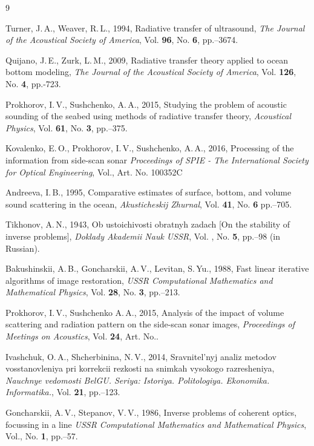 \documentclass{procDDs}
\begin{document}
\begin {thebibliography}{9}

 Turner, J.\,A., Weaver, R.\,L., 1994, 
Radiative transfer of ultrasound, 
\emph{The Journal of the Acoustical Society of America},  
Vol.\; {\bf 96}, No. {\bf 6}, pp.--3674.

 Quijano, J.\,E., Zurk, L.\,M., 2009, 
Radiative transfer theory applied to ocean bottom modeling, 
\emph{The Journal of the Acoustical Society of America},  
Vol.\; {\bf 126}, No. {\bf 4}, pp.-723.

  Prokhorov, I.\,V., Sushchenko, A.\,A., 2015, 
Studying the problem of acoustic sounding of the seabed using methods of radiative transfer theory, 
\emph{Acoustical Physics},
Vol.\; {\bf 61}, No. {\bf 3}, pp.--375.

 Kovalenko, E.\,O., Prokhorov, I.\,V., Sushchenko, A.\,A., 2016,
Processing of the information from side-scan sonar
\emph{Proceedings of SPIE - The International Society for Optical Engineering},
Vol., Art. No. \;100352C

 Andreeva,  I.\,B., 1995,
Comparative estimates of surface, bottom, and volume sound scattering in the ocean,
\emph{Akusticheskij Zhurnal},
Vol.\; {\bf 41}, No. {\bf 6} pp.--705.

 Tikhonov, A.\,N., 1943, 
Ob ustoichivosti obratnyh zadach [On the stability of inverse problems], 
\emph{Doklady Akademii Nauk USSR}, 
Vol. , No. {\bf 5}, pp.--98 (in Russian).

 Bakushinskii, A.\,B., Goncharskii, A.\,V., Levitan, S.\,Yu., 1988,
Fast linear iterative algorithms of image restoration,
\emph{USSR Computational Mathematics and Mathematical Physics},
Vol.\; {\bf 28}, No. { \bf 3},  pp.--213.

 Prokhorov, I.\,V., Sushchenko A.\,A., 2015,
Analysis of the impact of volume scattering and radiation pattern on the side-scan sonar images, 
\emph{Proceedings of Meetings on Acoustics},
Vol.\; {\bf 24}, Art. No..

 Ivashchuk, O.\,A., Shcherbinina, N.\,V., 2014,
Sravnitel'nyj analiz metodov vosstanovleniya pri korrekcii rezkosti na snimkah vysokogo razresheniya, 
\emph{Nauchnye vedomosti BelGU. Seriya: Istoriya. Politologiya. Ekonomika. Informatika.},
Vol.\; {\bf 21}, pp.--123.

  Goncharskii, A.\,V., Stepanov, V.\,V., 1986,
Inverse problems of coherent optics, focussing in a line
\emph{USSR Computational Mathematics and Mathematical Physics},
Vol., No. {\bf 1},  pp.--57.


\end{thebibliography}
\end{document}
